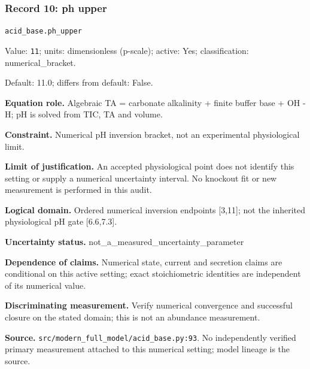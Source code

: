 \subsubsection*{Record 10: ph upper}
{\small \nolinkurl{acid_base.ph_upper}\par

Value: \texttt{11}; units: dimensionless (p-scale); active: Yes; classification: numerical\_bracket.\par

Default: 11.0; differs from default: False.\par

\textbf{Equation role.} Algebraic TA = carbonate alkalinity + finite buffer base + OH - H; pH is solved from TIC, TA and volume.\par

\textbf{Constraint.} Numerical pH inversion bracket, not an experimental physiological limit.\par

\textbf{Limit of justification.} An accepted physiological point does not identify this setting or supply a numerical uncertainty interval. No knockout fit or new measurement is performed in this audit.\par

\textbf{Logical domain.} Ordered numerical inversion endpoints [3,11]; not the inherited physiological pH gate [6.6,7.3].\par

\textbf{Uncertainty status.} not\_a\_measured\_uncertainty\_parameter\par

\textbf{Dependence of claims.} Numerical state, current and secretion claims are conditional on this active setting; exact stoichiometric identities are independent of its numerical value.\par

\textbf{Discriminating measurement.} Verify numerical convergence and successful closure on the stated domain; this is not an abundance measurement.\par

\textbf{Source.} \nolinkurl{src/modern_full_model/acid_base.py:93}. No independently verified primary measurement attached to this numerical setting; model lineage is the source.\par}

